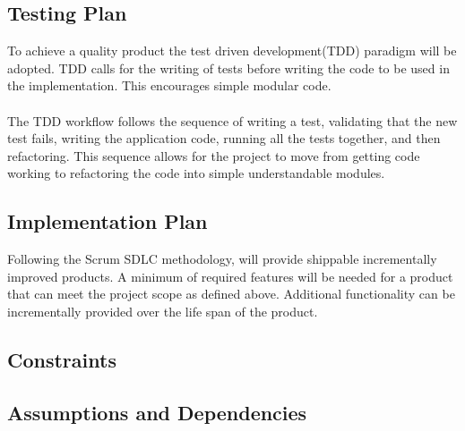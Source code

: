 \documentclass[10pt,twocolumn]{witseiepaper}
\begin{document}
\subsection{Testing Plan}

To achieve a quality product the test driven development(TDD) paradigm will be adopted. TDD calls for the writing of tests before writing the code to be used in the implementation. This encourages simple modular code.\\\\
 The TDD workflow follows the sequence of writing a test, validating that the new test fails, writing the application code, running all the tests together, and then refactoring. This sequence allows for the project to move from getting code working to refactoring the code into simple understandable modules.

\subsection{Implementation Plan}

Following the Scrum SDLC methodology, will provide shippable incrementally improved products. A minimum of required features will be needed for a product that can meet the project scope as defined above. Additional functionality can be incrementally provided over the life span of the product.

\subsection{Constraints}

\subsection{Assumptions and Dependencies}





%



\end{document}

